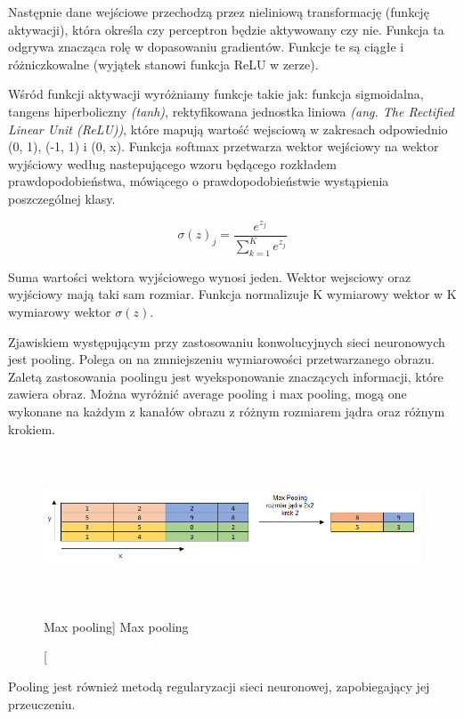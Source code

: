 \documentclass[a4paper,12pt]{article}
\begin{document}
			Następnie dane wejściowe przechodzą przez nieliniową transformację (funkcję aktywacji), która określa czy perceptron będzie aktywowany czy nie. 
			Funkcja ta odgrywa znacząca rolę w dopasowaniu gradientów. Funkcje te są ciągłe i różniczkowalne (wyjątek stanowi funkcja ReLU w zerze).
        
			Wśród funkcji aktywacji wyróżniamy funkcje takie jak: funkcja sigmoidalna,  tangens hiperboliczny \textit{(tanh)}, rektyfikowana jednostka liniowa 
			\textit{(ang. The Rectified Linear Unit (ReLU))}, które mapują wartość wejsciową w zakresach odpowiednio (0, 1), (-1, 1) i (0, x). 
			Funkcja softmax przetwarza wektor wejściowy na wektor wyjściowy według nastepującego wzoru będącego rozkładem prawdopodobieństwa, 
			mówiącego o prawdopodobieństwie wystąpienia poszczególnej klasy. 
        
			\begin{displaymath}
				\sigma (z)_{j} = \frac{e^{z_{j}}}{ \sum_{k=1}^K e^{z_{j}}}
			\end{displaymath}

			Suma wartości wektora wyjściowego wynosi jeden. Wektor wejsciowy oraz wyjściowy mają taki sam rozmiar. Funkcja normalizuje K wymiarowy wektor w K wymiarowy wektor  
			$ \sigma (z)$. 
        
	    \par Zjawiskiem występującym przy zastosowaniu konwolucyjnych sieci neuronowych jest pooling. Polega on na zmniejszeniu wymiarowości 
			przetwarzanego obrazu. Zaletą zastosowania poolingu jest wyeksponowanie znaczących informacji, które zawiera obraz. Można wyróżnić average 
			pooling i max pooling, mogą one wykonane na każdym z kanałów obrazu z różnym rozmiarem jądra oraz różnym krokiem. 
	 
			\begin{figure}[!ht]
				\centering
				\includegraphics[width=17cm, height=4.5cm]{image//maxPoolingImg.png}
				\caption
				[Max pooling]
				{Max pooling}
			\end{figure}
        
			Pooling jest również metodą regularyzacji sieci neuronowej, zapobiegający jej przeuczeniu. 
        
\end{document}
